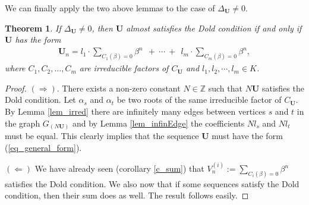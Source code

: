\documentclass[preprint,12pt]{elsarticle}
\newcommand{\Z}{\mathbb{Z}}
\newtheorem{theorem}{Theorem}
\begin{document}
We can finally apply the two above lemmas to the case of $\Delta_\mathbf{U} \not=0$.

\begin{theorem}\label{theor_general_form}
    If $\Delta_{\mathbf U}\not=0$, then ${\mathbf U}$ almost satisfies the Dold condition if and only if ${\mathbf U}$ has the form %
    \begin{align}\label{eq_general_form}
        \mathbf U_n = l_1\cdot\sum_{C_1(\beta)=0} \beta^n   \ \ +\ \cdots\ + \ \
        l_m\cdot\sum_{C_m(\beta)=0} \beta^n ,   
    \end{align}
    where $C_1, C_2, \ldots, C_m$ are irreducible factors of $C_{\mathbf U}$ and $l_1, l_2, \cdots, l_m \in K$.
\end{theorem}

\begin{proof}

$(\Rightarrow)$. There exists a non-zero constant $N\in\Z$ such that $N\mathbf{U}$ satisfies the Dold condition. Let $\alpha_s$ and $\alpha_t$ be two roots of the same irreducible factor of $C_{\mathbf{U}}$. By Lemma \ref{lem_irred} there are infinitely many edges between vertices $s$ and $t$ in the graph $G_{(N\mathbf{U})}$ and by Lemma \ref{lem_infinEdge} the coefficients $Nl_s$ and $Nl_t$ must be equal. This clearly implies that the sequence $\mathbf{U}$ must have the form (\ref{eq_general_form}).

$(\Leftarrow)$  We have already seen (corollary \ref{c_sum}) that $  V^{(i)}_n := \sum_{C_i(\beta)=0} \beta^n$ satisfies the Dold condition. We also now that if some sequences satisfy the Dold condition, then their sum does as well. The result follows easily.
        
\end{proof}
\end{document}
